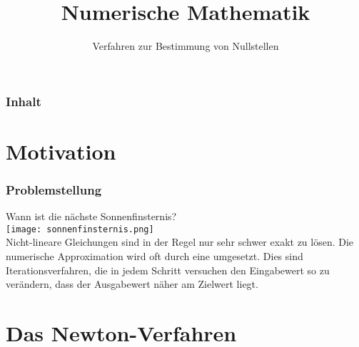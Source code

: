 

\title{Numerische Mathematik}
\subtitle{Verfahren zur Bestimmung von Nullstellen}



\makeTitlePage

\begin{frame}\frametitle{Inhalt}
   \tableofcontents
\end{frame}
%

%

\section{Motivation}
\makeSectionDividerPage
%
%
\begin{frame}\frametitle{Problemstellung}
Wann ist die nächste Sonnenfinsternis?\\\vspace{1mm}
\texttt{[image: sonnenfinsternis.png]}\\\vspace{1mm} \pause
Nicht-lineare Gleichungen sind in der Regel nur sehr schwer exakt zu lösen. Die numerische Approximation wird oft durch eine  umgesetzt. Dies sind Iterationsverfahren, die in jedem Schritt versuchen den Eingabewert so zu verändern, dass der Ausgabewert näher am Zielwert liegt.

\end{frame}
%
%

%
\section{Das Newton-Verfahren}
\makeSectionDividerPage
